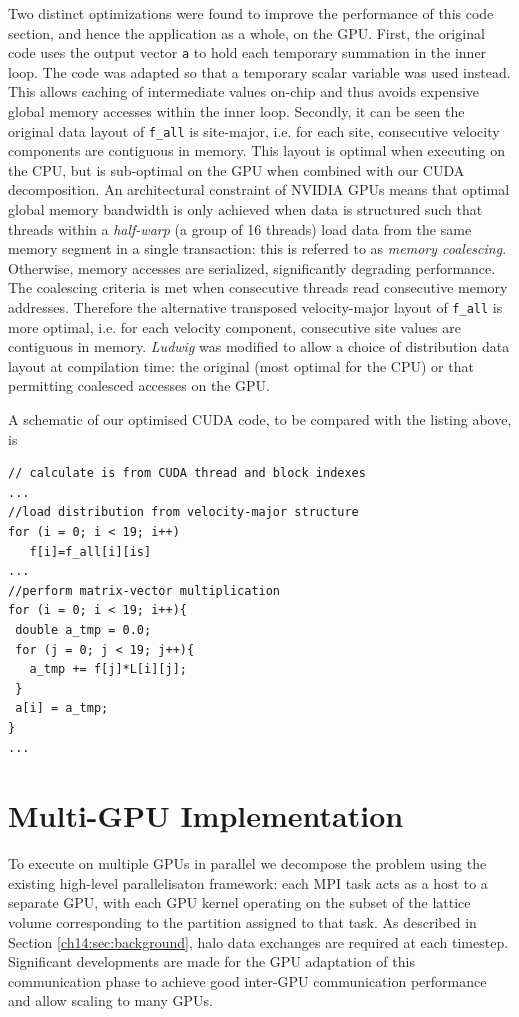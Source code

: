 Two distinct optimizations were found to improve the performance of this code section, and hence the application as a whole, on
the GPU.  First, the original code uses the output vector \verb+a+ to
hold each temporary summation in the inner loop.  The code was adapted
so that a temporary scalar variable was used instead. This allows
caching of intermediate values on-chip and thus avoids expensive
global memory accesses within the inner loop.  Secondly, it can be
seen the original data layout of \verb+f_all+ is site-major, i.e. for
each site, consecutive velocity components are contiguous in memory.
This layout is optimal when executing on the CPU, but is sub-optimal
on the GPU when combined with our CUDA decomposition. An architectural
constraint of NVIDIA GPUs means that optimal global memory bandwidth
is only achieved when data is structured such that threads within a
{\it half-warp} (a group of 16 threads) load data from the same memory
segment in a single transaction: this is referred to as {\it memory
  coalescing}.  Otherwise, memory accesses are serialized,
significantly degrading performance. The coalescing criteria is met
when consecutive threads read consecutive memory addresses. Therefore
the alternative transposed velocity-major layout of \verb+f_all+ is
more optimal, i.e.  for each velocity component, consecutive site
values are contiguous in memory.  \textit{Ludwig} was modified to
allow a choice of distribution data layout at compilation time: the
original (most optimal for the CPU) or that permitting coalesced
accesses on the GPU.

A schematic of our optimised CUDA code, to be compared with the
listing above, is
{\footnotesize
\begin{verbatim}
// calculate is from CUDA thread and block indexes
...
//load distribution from velocity-major structure
for (i = 0; i < 19; i++)    
   f[i]=f_all[i][is]
...
//perform matrix-vector multiplication  
for (i = 0; i < 19; i++){    
 double a_tmp = 0.0;    
 for (j = 0; j < 19; j++){      
   a_tmp += f[j]*L[i][j];   
 }
 a[i] = a_tmp;    
}
...
\end{verbatim}
}


\section{Multi-GPU Implementation}\label{ch14:sec:parallelgpu}


To execute on multiple GPUs in parallel we decompose the problem using
the existing high-level parallelisaton framework: each MPI task acts
as a host to a separate GPU, with each GPU kernel operating on the
subset of the lattice volume corresponding to the partition assigned
to that task.  As described in Section \ref{ch14:sec:background}, halo
data exchanges are required at each timestep.  Significant
developments are made for the GPU adaptation of this communication
phase to achieve good inter-GPU communication performance and allow
scaling to many GPUs.

